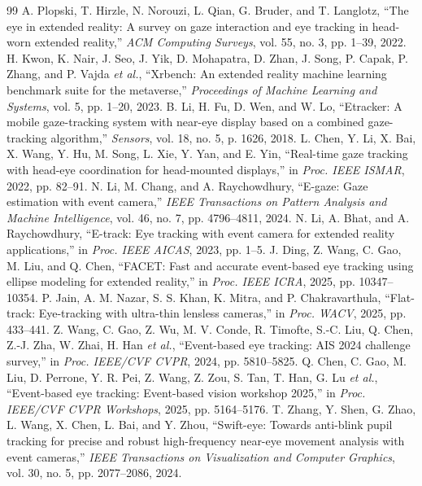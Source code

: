 \documentclass[journal]{IEEEtran}
\newcommand{\etal}{\textit{et al.}}
\begin{document}
\begin{thebibliography}{99}
\footnotesize
{} A. Plopski, T. Hirzle, N. Norouzi, L. Qian, G. Bruder, and T. Langlotz, ``The eye in extended reality: A survey on gaze interaction and eye tracking in head-worn extended reality,'' \emph{ACM Computing Surveys}, vol. 55, no. 3, pp. 1--39, 2022.
 H. Kwon, K. Nair, J. Seo, J. Yik, D. Mohapatra, D. Zhan, J. Song, P. Capak, P. Zhang, and P. Vajda \etal, ``Xrbench: An extended reality machine learning benchmark suite for the metaverse,'' \emph{Proceedings of Machine Learning and Systems}, vol. 5, pp. 1--20, 2023.
 B. Li, H. Fu, D. Wen, and W. Lo, ``Etracker: A mobile gaze-tracking system with near-eye display based on a combined gaze-tracking algorithm,'' \emph{Sensors}, vol. 18, no. 5, p. 1626, 2018.
 L. Chen, Y. Li, X. Bai, X. Wang, Y. Hu, M. Song, L. Xie, Y. Yan, and E. Yin, ``Real-time gaze tracking with head-eye coordination for head-mounted displays,'' in \emph{Proc. IEEE ISMAR}, 2022, pp. 82--91.
 N. Li, M. Chang, and A. Raychowdhury, ``E-gaze: Gaze estimation with event camera,'' \emph{IEEE Transactions on Pattern Analysis and Machine Intelligence}, vol. 46, no. 7, pp. 4796--4811, 2024.
 N. Li, A. Bhat, and A. Raychowdhury, ``E-track: Eye tracking with event camera for extended reality applications,'' in \emph{Proc. IEEE AICAS}, 2023, pp. 1--5.
 J. Ding, Z. Wang, C. Gao, M. Liu, and Q. Chen, ``FACET: Fast and accurate event-based eye tracking using ellipse modeling for extended reality,'' in \emph{Proc. IEEE ICRA}, 2025, pp. 10347--10354.
 P. Jain, A. M. Nazar, S. S. Khan, K. Mitra, and P. Chakravarthula, ``Flat-track: Eye-tracking with ultra-thin lensless cameras,'' in \emph{Proc. WACV}, 2025, pp. 433--441.
 Z. Wang, C. Gao, Z. Wu, M. V. Conde, R. Timofte, S.-C. Liu, Q. Chen, Z.-J. Zha, W. Zhai, H. Han \etal, ``Event-based eye tracking: AIS 2024 challenge survey,'' in \emph{Proc. IEEE/CVF CVPR}, 2024, pp. 5810--5825.
 Q. Chen, C. Gao, M. Liu, D. Perrone, Y. R. Pei, Z. Wang, Z. Zou, S. Tan, T. Han, G. Lu \etal, ``Event-based eye tracking: Event-based vision workshop 2025,'' in \emph{Proc. IEEE/CVF CVPR Workshops}, 2025, pp. 5164--5176.
 T. Zhang, Y. Shen, G. Zhao, L. Wang, X. Chen, L. Bai, and Y. Zhou, ``Swift-eye: Towards anti-blink pupil tracking for precise and robust high-frequency near-eye movement analysis with event cameras,'' \emph{IEEE Transactions on Visualization and Computer Graphics}, vol. 30, no. 5, pp. 2077--2086, 2024.

\end{thebibliography}
\end{document}
